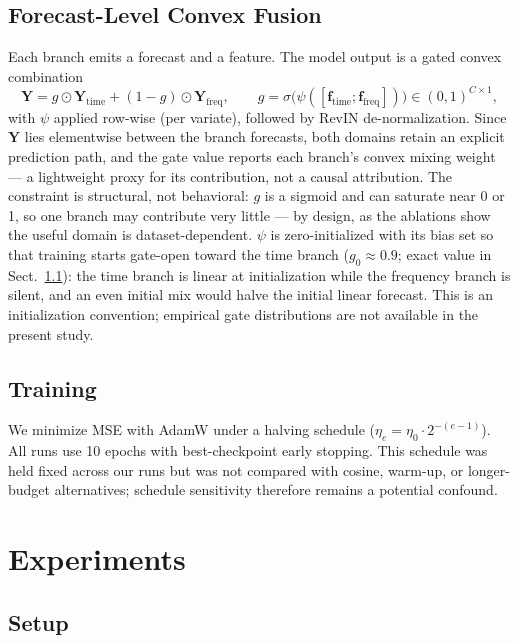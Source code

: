 \documentclass[runningheads]{llncs}
\begin{document}
\subsection{Forecast-Level Convex Fusion}
\label{sec:fusion}

Each branch emits a forecast and a feature. The model output is a gated
convex combination
\begin{equation}
\mathbf{Y} = g \odot \mathbf{Y}_{\mathrm{time}} + (1 - g) \odot
\mathbf{Y}_{\mathrm{freq}}, \qquad
g = \sigma\!\big(\psi([\mathbf{f}_{\mathrm{time}};
\mathbf{f}_{\mathrm{freq}}])\big) \in (0,1)^{C\times 1},
\label{eq:fusion}
\end{equation}
with $\psi$ applied row-wise (per variate), followed by RevIN
de-normalization. Since $\mathbf{Y}$ lies elementwise between the branch
forecasts, both domains retain an explicit prediction path, and the gate
value reports each branch's convex mixing weight --- a lightweight proxy
for its contribution, not a causal attribution. The constraint is
structural, not behavioral: $g$ is a sigmoid and can saturate near 0 or 1,
so one branch may contribute very little --- by design, as the ablations
show the useful domain is dataset-dependent. $\psi$ is zero-initialized
with its bias set so that training starts gate-open toward the time branch
($g_0 \approx 0.9$; exact value in Sect.~\ref{sec:setup}): the time branch
is linear at initialization while the frequency branch is silent, and an
even initial mix would halve the initial linear forecast. This is an
initialization convention; empirical gate distributions are not available in
the present study.

\subsection{Training}
We minimize MSE with AdamW under a halving schedule
($\eta_e = \eta_0 \cdot 2^{-(e-1)}$). All runs use 10 epochs with
best-checkpoint early stopping. This schedule was held fixed across our runs
but was not compared with cosine, warm-up, or longer-budget alternatives;
schedule sensitivity therefore remains a potential confound.

\section{Experiments}
\label{sec:experiments}

\subsection{Setup}
\label{sec:setup}
\end{document}
